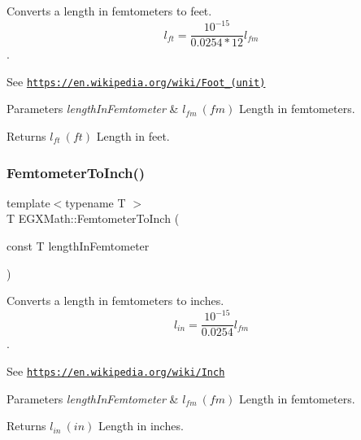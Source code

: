 Converts a length in femtometers to feet. \[ l_{ft}= \frac{10^{-15}}{0.0254 * 12} l_{fm} \]. 

See \href{https://en.wikipedia.org/wiki/Foot_(unit)}{\tt https\+://en.\+wikipedia.\+org/wiki/\+Foot\+\_\+(unit)} 
\begin{DoxyParams}{Parameters}
{\em length\+In\+Femtometer} & $ l_{fm}\ (fm)$ Length in femtometers. \\
\hline
\end{DoxyParams}
\begin{DoxyReturn}{Returns}
$ l_{ft}\ (ft)$ Length in feet. 
\end{DoxyReturn}
\mbox{\label{group___e_g_x_math-_conversions-_length_conversions-_s_i-_femtometer-_imperial_ga51c3107a7cfac96232eb0b040c3192a1}} 
\subsubsection{\texorpdfstring{Femtometer\+To\+Inch()}{FemtometerToInch()}}
{\footnotesize\ttfamily template$<$typename T $>$ \\
T E\+G\+X\+Math\+::\+Femtometer\+To\+Inch (\begin{DoxyParamCaption}\item[{const T}]{length\+In\+Femtometer }\end{DoxyParamCaption})}



Converts a length in femtometers to inches. \[ l_{in}= \frac{10^{-15}}{0.0254} l_{fm} \]. 

See \href{https://en.wikipedia.org/wiki/Inch}{\tt https\+://en.\+wikipedia.\+org/wiki/\+Inch} 
\begin{DoxyParams}{Parameters}
{\em length\+In\+Femtometer} & $ l_{fm}\ (fm)$ Length in femtometers. \\
\hline
\end{DoxyParams}
\begin{DoxyReturn}{Returns}
$ l_{in}\ (in)$ Length in inches. 
\end{DoxyReturn}
\mbox{\label{group___e_g_x_math-_conversions-_length_conversions-_s_i-_femtometer-_imperial_gacfcd599a1c2c834f3bbb5f3f991d55df}} 
